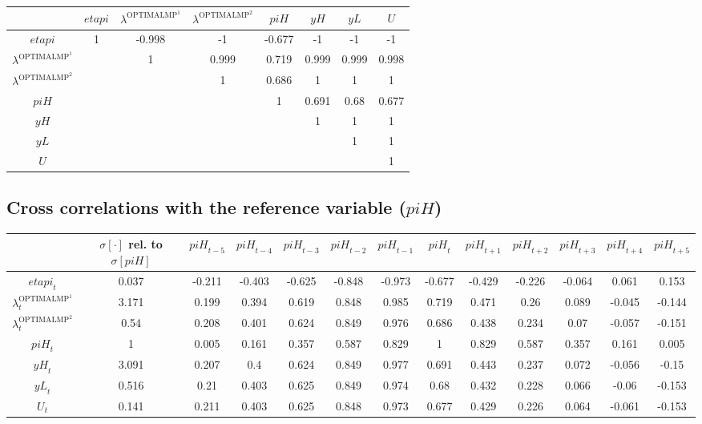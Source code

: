 \begin{tabular}{c|ccccccc|}
  & ${e\!t\!a\!p\!i}$ & $\lambda^{\mathrm{OPTIMALMP}^{\mathrm{1}}}$ & $\lambda^{\mathrm{OPTIMALMP}^{\mathrm{2}}}$ & ${p\!i\!H}$ & ${y\!H}$ & ${y\!L}$ & $U$\\
\hline
${e\!t\!a\!p\!i}$ & 1 & -0.998 & -1 & -0.677 & -1 & -1 & -1 \\
$\lambda^{\mathrm{OPTIMALMP}^{\mathrm{1}}}$ &  & 1 & 0.999 & 0.719 & 0.999 & 0.999 & 0.998 \\
$\lambda^{\mathrm{OPTIMALMP}^{\mathrm{2}}}$ &  &  & 1 & 0.686 & 1 & 1 & 1 \\
${p\!i\!H}$ &  &  &  & 1 & 0.691 & 0.68 & 0.677 \\
${y\!H}$ &  &  &  &  & 1 & 1 & 1 \\
${y\!L}$ &  &  &  &  &  & 1 & 1 \\
$U$ &  &  &  &  &  &  & 1 \\
\hline
\end{tabular}


\subsection{Cross correlations with the reference variable (${p\!i\!H}$)}

\begin{tabular}{c|c|c|c|c|c|c|c|c|c|c|c|c|}
  & $\sigma[\cdot]$ rel. to $\sigma[{p\!i\!H}]$ & ${p\!i\!H}_{t-5}$ & ${p\!i\!H}_{t-4}$ & ${p\!i\!H}_{t-3}$ & ${p\!i\!H}_{t-2}$ & ${p\!i\!H}_{t-1}$ & ${p\!i\!H}_{t}$ & ${p\!i\!H}_{t+1}$ & ${p\!i\!H}_{t+2}$ & ${p\!i\!H}_{t+3}$ & ${p\!i\!H}_{t+4}$ & ${p\!i\!H}_{t+5}$\\
\hline
${e\!t\!a\!p\!i}_{t}$ & 0.037 & -0.211 & -0.403 & -0.625 & -0.848 & -0.973 & -0.677 & -0.429 & -0.226 & -0.064 & 0.061 & 0.153 \\
$\lambda^{\mathrm{OPTIMALMP}^{\mathrm{1}}}_{t}$ & 3.171 & 0.199 & 0.394 & 0.619 & 0.848 & 0.985 & 0.719 & 0.471 & 0.26 & 0.089 & -0.045 & -0.144 \\
$\lambda^{\mathrm{OPTIMALMP}^{\mathrm{2}}}_{t}$ & 0.54 & 0.208 & 0.401 & 0.624 & 0.849 & 0.976 & 0.686 & 0.438 & 0.234 & 0.07 & -0.057 & -0.151 \\
${p\!i\!H}_{t}$ & 1 & 0.005 & 0.161 & 0.357 & 0.587 & 0.829 & 1 & 0.829 & 0.587 & 0.357 & 0.161 & 0.005 \\
${y\!H}_{t}$ & 3.091 & 0.207 & 0.4 & 0.624 & 0.849 & 0.977 & 0.691 & 0.443 & 0.237 & 0.072 & -0.056 & -0.15 \\
${y\!L}_{t}$ & 0.516 & 0.21 & 0.403 & 0.625 & 0.849 & 0.974 & 0.68 & 0.432 & 0.228 & 0.066 & -0.06 & -0.153 \\
$U_{t}$ & 0.141 & 0.211 & 0.403 & 0.625 & 0.848 & 0.973 & 0.677 & 0.429 & 0.226 & 0.064 & -0.061 & -0.153 \\
\hline
\end{tabular}


